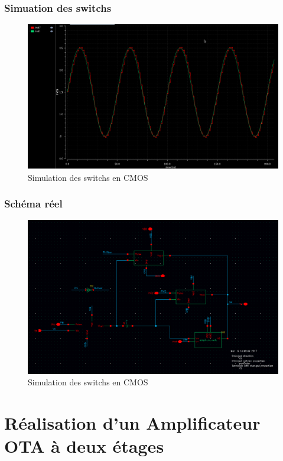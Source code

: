 \documentclass{beamer}
\begin{document}

\begin{frame}
\frametitle{Simuation des switchs}

\begin{figure}[!htb]
  \includegraphics[width=0.7\linewidth]{switchs_simu.png}
  \caption{Simulation des switchs en CMOS}
\end{figure}

\end{frame}


\begin{frame}
\frametitle{Sch\'ema r\'eel}

\begin{figure}[!htb]
  \includegraphics[width=0.7\linewidth]{EB-Schematic.png}
  \caption{Simulation des switchs en CMOS}
\end{figure}

\end{frame}



\section{R\'ealisation d'un Amplificateur OTA \`a deux \'etages}
\end{document}
